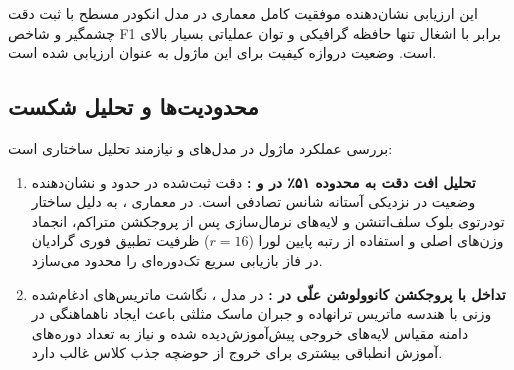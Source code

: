 این ارزیابی نشان‌دهنده موفقیت کامل معماری در مدل انکودر مسطح  با ثبت دقت چشمگیر  و شاخص F1 برابر  با اشغال تنها  حافظه گرافیکی و توان عملیاتی بسیار بالای  است. وضعیت دروازه کیفیت برای این ماژول به عنوان  ارزیابی شده است.

\subsection{محدودیت‌ها و تحلیل شکست}
بررسی عملکرد ماژول در مدل‌های  و  نیازمند تحلیل ساختاری است:
\begin{enumerate}
    \item \textbf{تحلیل افت دقت به محدوده ۵۱٪ در  و :} دقت ثبت‌شده در حدود  و  نشان‌دهنده وضعیت  در نزدیکی آستانه شانس تصادفی است. در معماری ، به دلیل ساختار تودرتوی بلوک سلف‌اتنشن و لایه‌های نرمال‌سازی پس از پروجکشن متراکم، انجماد وزن‌های اصلی و استفاده از رتبه پایین لورا ($r=16$) ظرفیت تطبیق فوری گرادیان در فاز بازیابی سریع تک‌دوره‌ای را محدود می‌سازد.
    \item \textbf{تداخل با پروجکشن کانوولوشن علّی در :} در مدل ، نگاشت ماتریس‌های ادغام‌شده وزنی  با هندسه ماتریس ترانهاده و جبران ماسک مثلثی باعث ایجاد ناهماهنگی در دامنه مقیاس لایه‌های خروجی پیش‌آموزش‌دیده شده و نیاز به تعداد دوره‌های آموزش انطباقی بیشتری برای خروج از حوضچه جذب کلاس غالب دارد.
\end{enumerate}
